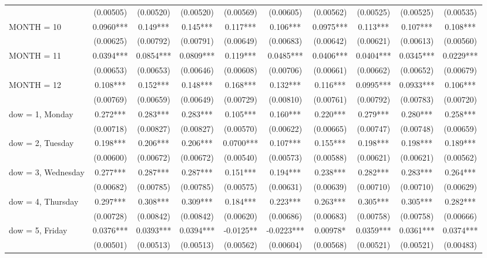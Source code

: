 \begin{tabular}{lccccccccc}
 & (0.00505) & (0.00520) & (0.00520) & (0.00569) & (0.00605) & (0.00562) & (0.00525) & (0.00525) & (0.00535) \\
MONTH = 10 & 0.0960*** & 0.149*** & 0.145*** & 0.117*** & 0.106*** & 0.0975*** & 0.113*** & 0.107*** & 0.108*** \\
 & (0.00625) & (0.00792) & (0.00791) & (0.00649) & (0.00683) & (0.00642) & (0.00621) & (0.00613) & (0.00560) \\
MONTH = 11 & 0.0394*** & 0.0854*** & 0.0809*** & 0.119*** & 0.0485*** & 0.0406*** & 0.0404*** & 0.0345*** & 0.0229*** \\
 & (0.00653) & (0.00653) & (0.00646) & (0.00608) & (0.00706) & (0.00661) & (0.00662) & (0.00652) & (0.00679) \\
MONTH = 12 & 0.108*** & 0.152*** & 0.148*** & 0.168*** & 0.132*** & 0.116*** & 0.0995*** & 0.0933*** & 0.106*** \\
 & (0.00769) & (0.00659) & (0.00649) & (0.00729) & (0.00810) & (0.00761) & (0.00792) & (0.00783) & (0.00720) \\
dow = 1, Monday & 0.272*** & 0.283*** & 0.283*** & 0.105*** & 0.160*** & 0.220*** & 0.279*** & 0.280*** & 0.258*** \\
 & (0.00718) & (0.00827) & (0.00827) & (0.00570) & (0.00622) & (0.00665) & (0.00747) & (0.00748) & (0.00659) \\
dow = 2, Tuesday & 0.198*** & 0.206*** & 0.206*** & 0.0700*** & 0.107*** & 0.155*** & 0.198*** & 0.198*** & 0.189*** \\
 & (0.00600) & (0.00672) & (0.00672) & (0.00540) & (0.00573) & (0.00588) & (0.00621) & (0.00621) & (0.00562) \\
dow = 3, Wednesday & 0.277*** & 0.287*** & 0.287*** & 0.151*** & 0.194*** & 0.238*** & 0.282*** & 0.283*** & 0.264*** \\
 & (0.00682) & (0.00785) & (0.00785) & (0.00575) & (0.00631) & (0.00639) & (0.00710) & (0.00710) & (0.00629) \\
dow = 4, Thursday & 0.297*** & 0.308*** & 0.309*** & 0.184*** & 0.223*** & 0.263*** & 0.305*** & 0.305*** & 0.282*** \\
 & (0.00728) & (0.00842) & (0.00842) & (0.00620) & (0.00686) & (0.00683) & (0.00758) & (0.00758) & (0.00666) \\
dow = 5, Friday & 0.0376*** & 0.0393*** & 0.0394*** & -0.0125** & -0.0223*** & 0.00978* & 0.0359*** & 0.0361*** & 0.0374*** \\
 & (0.00501) & (0.00513) & (0.00513) & (0.00562) & (0.00604) & (0.00568) & (0.00521) & (0.00521) & (0.00483) \\

\end{tabular}
